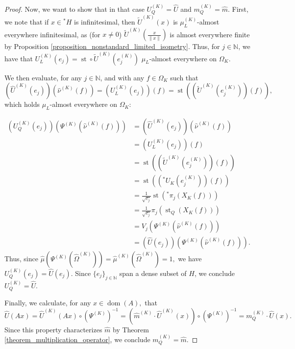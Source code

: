 \documentclass{amsart}
\theoremstyle{definition}
\theoremstyle{remark}
\def \Dom{\operatorname{dom}}
\def \St{\operatorname{st}}
\def \HOM{\hat{\Omega}}
\def \HMU{\hat{\mu}}
\def \HNU{\hat{\nu}}
\def \HU{\hat{U}}
\def \Hm{\hat{m}}
\begin{document}
\begin{proof}
	Now, we want to show that in that case $U_Q^{(K)}=\HU$ and $m_Q^{(K)}=\Hm.$ First, we note that if $x\in{}^*H$ is infinitesimal, then $\tilde{U}^{(K)}(x)$ is $\mu_L^{(K)}$-almost everywhere infinitesimal, as (for $x\neq 0$) $\tilde{U}^{(K)}(\frac{x}{\|x\|})$ is almost everywhere finite by Proposition \ref{proposition_nonstandard_limited_isometry}. Thus, for $j\in\mathbb{N}$, we  have that $U_L^{(K)}(e_j)=\St\circ\tilde{U}^{(K)}(e_j^{(K)})$ $\mu_L$-almost everywhere on $\Omega_K$. 
	
	We then evaluate, for any $j\in\mathbb{N}$, and with any $f\in\Omega_K$ such that $$(\HU^{(K)}(e_j))(\HNU^{(K)}(f))=(U_L^{(K)}(e_j))(f)=\St((\tilde{U}^{(K)}(e_j^{(K)}))(f)),$$ which holds $\mu_L$-almost everywhere on $\Omega_K$:
	
	\begin{align*}
		(U_Q^{(K)}(e_j))(\Psi^{(K)}(\HNU^{(K)}(f)))&=(\HU^{(K)}(e_j))(\HNU^{(K)}(f))\\
		&=(U_L^{(K)}(e_j))(f)\\
		&=\St((\tilde{U}^{(K)}(e_j^{(K)}))(f))\\
		&=\St(({}^*U_K(e_j^{(K)}))(f))\\
		&=\frac{1}{\sqrt{c_j}}\St({}^*\pi_j(X_K(f)))\\
		&=\frac{1}{\sqrt{c_j}}\pi_j\left(\St_Q(X_K(f))\right)\\
		&=V_j(\Psi^{(K)}(\HNU^{(K)}(f)))\\
		&=(\HU(e_j))(\Psi^{(K)}(\HNU^{(K)}(f))).
	\end{align*}
	Thus, since $\HMU(\Psi^{(K)}(\HOM^{(K)}))=\HMU^{(K)}(\HOM^{(K)})=1,$ we have $U_Q^{(K)}(e_j)=\HU(e_j).$ Since $\{e_j\}_{j\in\mathbb{N}}$ span a dense subset of $H$, we conclude $U_Q^{(K)}=\HU.$
	
	Finally, we calculate, for any $x\in\Dom(A),$ that  $$\HU(Ax)=\HU^{(K)}(Ax)\circ (\Psi^{(K)})^{-1}= (\Hm^{(K)}\cdot \HU^{(K)}(x))\circ (\Psi^{(K)})^{-1}=m_Q^{(K)}\cdot \HU(x). $$ Since this property characterizes $\Hm$ by Theorem \ref{theorem_multiplication_operator}, we conclude $m_Q^{(K)}=\Hm$.
\end{proof}
\end{document}
